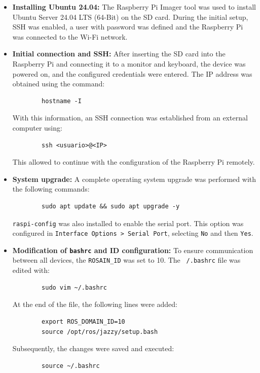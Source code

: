     \begin{itemize}
        \item \textbf{Installing Ubuntu 24.04:} 
        The Raspberry Pi Imager tool was used to install Ubuntu Server 24.04 LTS (64-Bit) on the SD card. During the initial setup, SSH was enabled, a user with password was defined and the Raspberry Pi was connected to the Wi-Fi network.
    
        \item \textbf{Initial connection and SSH:} 
        After inserting the SD card into the Raspberry Pi and connecting it to a monitor and keyboard, the device was powered on, and the configured credentials were entered. The IP address was obtained using the command:
        \begin{verbatim}
        hostname -I
        \end{verbatim}
        With this information, an SSH connection was established from an external computer using:        \begin{verbatim}
        ssh <usuario>@<IP>
        \end{verbatim}
        This allowed to continue with the configuration of the Raspberry Pi remotely.

        \item \textbf{System upgrade:} 
        A complete operating system upgrade was performed with the following commands:
        \begin{verbatim}
        sudo apt update && sudo apt upgrade -y
        \end{verbatim}
        \texttt{raspi-config} was also installed to enable the serial port. This option was configured in \texttt{Interface Options > Serial Port}, selecting \texttt{No} and then \texttt{Yes}.

        \item \textbf{Modification of \texttt{bashrc} and ID configuration:} 
        To ensure communication between all devices, the \texttt{ROSAIN_ID} was set to 10. The \texttt{~/.bashrc} file was edited with:        \begin{verbatim}
        sudo vim ~/.bashrc
        \end{verbatim}
        At the end of the file, the following lines were added:
                \begin{verbatim}
        export ROS_DOMAIN_ID=10
        source /opt/ros/jazzy/setup.bash
        \end{verbatim}
        Subsequently, the changes were saved and executed:
        \begin{verbatim}
        source ~/.bashrc
        \end{verbatim}
    

\end{itemize}
